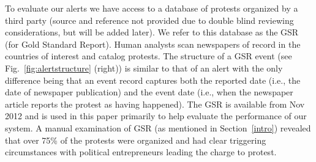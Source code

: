 To evaluate our alerts we have access to a database of protests organized by a third party (source and reference
not provided due to double blind reviewing considerations, but will be added later). We refer to this database as the
GSR (for Gold Standard Report). Human analysts scan newspapers of record in the countries of interest and catalog
protests. The structure of a GSR event (see Fig.~\ref{fig:alertstructure} (right)) is similar to that of an alert with
the only difference being that an event record captures both the reported date (i.e., the date of newspaper publication)
and the event date (i.e., when the newspaper article reports the protest as having happened).
The GSR is available from Nov 2012 
and is used in this paper primarily to 
help evaluate the performance of our system. A manual examination of GSR (as mentioned in Section~\ref{intro}) revealed
that over 75\% of the protests were organized and had clear triggering circumstances with political entrepreneurs leading the
charge to protest.



